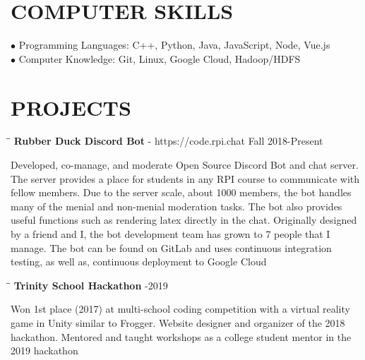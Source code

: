 \documentclass{res}
\begin{document}
\begin{resume}
\vspace{-0.1in}
\section{COMPUTER SKILLS}
    $\bullet$  Programming Languages: C++, Python, Java, JavaScript, Node, Vue.js\\
     $\bullet$ Computer Knowledge: Git, Linux, Google Cloud, Hadoop/HDFS

\vspace{-0.1in}
\section{PROJECTS}
	\vspace{-0.1in}
	\begin{tabbing}
   \hspace{2.3in}\= \hspace{3.6in}\= \kill
    {\bf Rubber Duck Discord Bot} - https://code.rpi.chat \>   \>Fall 2018-Present
   \end{tabbing}\vspace{-20pt}
   Developed, co-manage, and moderate Open Source Discord Bot and chat server. The server provides a place for students in any RPI course to communicate with fellow members. Due to the server scale, about 1000 members, the bot handles many of the menial and non-menial moderation tasks. The bot also provides useful functions such as rendering latex directly in the chat. Originally designed by a friend and I, the bot development team has grown to 7 people that I manage. The bot can be found on GitLab and uses continuous integration testing, as well as, continuous deployment to Google Cloud
	\vspace{-15pt}
	\begin{tabbing}
   \hspace{2.3in}\= \hspace{4in}\= \kill
    {\bf Trinity School Hackathon} \>  -2019
   \end{tabbing}\vspace{-20pt}
	Won 1st place (2017) at multi-school coding competition with a virtual reality game in Unity similar to Frogger. Website designer and organizer of the 2018 hackathon. Mentored and taught workshops as a college student mentor in the 2019 hackathon



\end{resume}
\end{document}
